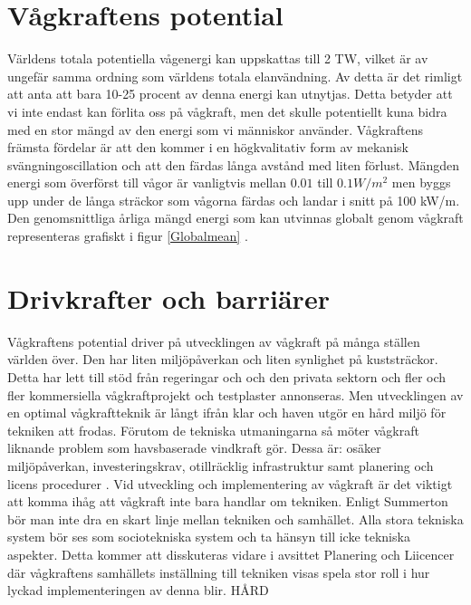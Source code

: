 \documentclass[10pt,a4paper,oneside]{article}
\begin{document}
\section{Vågkraftens potential}
Världens totala potentiella vågenergi kan uppskattas till 2 TW, vilket är av ungefär samma ordning som världens totala elanvändning. Av detta är det rimligt att anta att bara 10-25 procent av denna energi kan utnytjas. Detta betyder att vi inte endast kan förlita oss på vågkraft, men det skulle potentiellt kuna bidra med en stor mängd av den energi som vi människor använder. Vågkraftens främsta fördelar är att den kommer i en högkvalitativ form av mekanisk svängningoscillation och att den färdas långa avstånd med liten förlust. Mängden energi som överförst till vågor är vanligtvis mellan \begin{math} 0.01  \end{math} till \begin{math} 0.1 W/m^2 \end{math} men byggs upp under de långa sträckor som vågorna färdas och landar i snitt på 100 kW/m. Den genomsnittliga årliga mängd energi som kan utvinnas globalt genom vågkraft representeras grafiskt i figur \ref{Globalmean} \citep{Cruz}. 

\section{Drivkrafter och barriärer}
Vågkraftens potential driver på utvecklingen av vågkraft på många ställen världen över. Den har liten miljöpåverkan och liten synlighet på kuststräckor. Detta har lett till stöd från regeringar och och den privata sektorn och fler och fler kommersiella vågkraftprojekt och testplaster annonseras. Men utvecklingen av en optimal vågkraftteknik är långt ifrån klar och haven utgör en hård miljö för tekniken att frodas. Förutom de tekniska utmaningarna så möter vågkraft liknande problem som havsbaserade vindkraft gör. Dessa är: osäker miljöpåverkan, investeringskrav, otillräcklig infrastruktur samt planering och licens procedurer \cite{IRENA}. Vid utveckling och implementering av vågkraft är det viktigt att komma ihåg att vågkraft inte bara handlar om tekniken. Enligt Summerton bör man inte dra en skart linje mellan tekniken och samhället. Alla stora tekniska system bör ses som sociotekniska system och ta hänsyn till icke tekniska aspekter. Detta kommer att disskuteras vidare i avsittet Planering och Liicencer där vågkraftens samhällets inställning till tekniken visas spela stor roll i hur lyckad implementeringen av denna blir.  HÅRD
\end{document}
